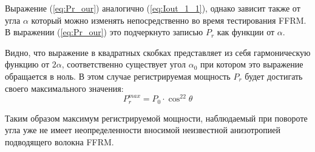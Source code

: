 \documentclass{article}
\begin{document}
Выражение (\ref{eq:Pr_our}) аналогично (\ref{eq:Iout_1_1}), однако зависит также от угла $\alpha$ который можно изменять непосредственно во время тестирования FFRM.
В выражении (\ref{eq:Pr_our}) это подчеркнуто записью $P_r$ как функции от $\alpha$.

\begin{comment}
Рассмотрим важную составляющую полученного выражения Im{…}, которую можно представить в виде 
\begin{equation}
    \label{eq:Pr_our_im}
    \Im{A B\cdot \cos2\alpha - \left( \frac{A^2-B^2}{2} \right)\cdot\sin2\alpha} = a\cdot\cos2\alpha - b\cdot\sin2\alpha=C\cdot\sin(\alpha_0 - 2\alpha)
\end{equation}
В (\ref{eq:Pr_our_im}) введены обозначения $a = \Im{A B}$ и $b = \Im{(B^2 - A^2)/2}$, а также для результирующей гармонической компоненты введены коэффициенты
\begin{equation}
    C = \sqrt{a^2+b^2} \qquad a_0 = \arctan\left( \frac{a}{b} \right)
\end{equation}
В результате выражение для регистрируемой мощности будет иметь вид  
\begin{equation}
    P_r(\alpha)=P_0\cdot\left[ 1-4 C^2\cdot\sin^2(\alpha_0 - 2\alpha) \right]\cdot\cos^22\theta
\end{equation}
где неизвестные параметры анизотропии подводящего волокна $A$ и $B$ пересчитаны в значения коэффициентов $C$ и $\alpha_0$.
Но угол  $\alpha$ является контролируемым параметром, который можно менять при тестировании FFRM.
При этом нетрудно видеть, что, независимо от значений $C$ и $\alpha_0$, максимум зависимости от $\alpha$ будет наблюдаться при выполнении $\alpha = \alpha_0/2$ и определяется равенством 
\begin{equation}
    P_{rmax}=P_0\cdot\cos^22\theta
\end{equation}
\end{comment}

Видно, что выражение в квадратных скобках представляет из себя гармоническую функцию от $2\alpha$, соответственно существует угол $\alpha_0$ при котором это выражение обращается в ноль.
В этом случае регистрируемая мощность $P_r$ будет достигать своего максимального значения:
\begin{equation}
    \label{eq:P_r_max}
    P_r^{max}=P_0\cdot\cos^22\theta
\end{equation}

Таким образом максимум регистрируемой мощности, наблюдаемый при повороте угла уже не имеет неопределенности вносимой неизвестной анизотропией подводящего волокна FFRM.
\end{document}
